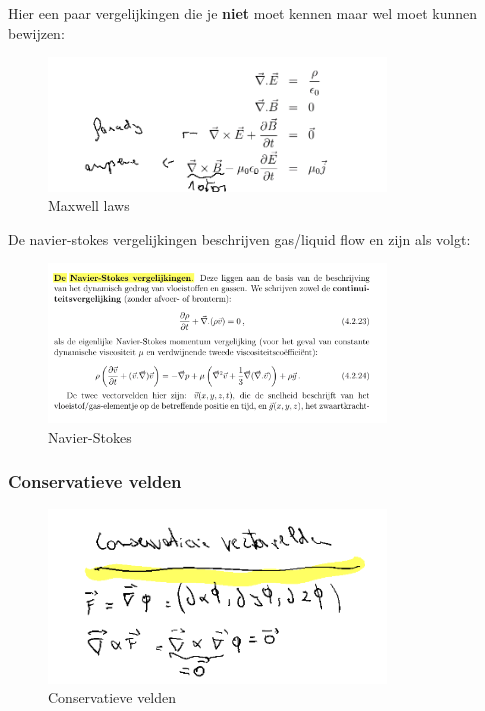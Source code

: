 \documentclass[a4paper]{article}
\begin{document}
Hier een paar vergelijkingen die je \textbf{niet} moet kennen maar wel moet kunnen bewijzen:


\begin{figure}[H]
	\centering
	\includegraphics[width=0.8\textwidth]{assets/maxwell.png}
	\caption{Maxwell laws}
	\label{fig:maxwell}
\end{figure}

De navier-stokes vergelijkingen beschrijven gas/liquid flow en zijn als volgt:

\begin{figure}[H]
	\centering
	\includegraphics[width=0.8\textwidth]{assets/navier_stokes.png}
	\caption{Navier-Stokes}
	\label{fig:navier_stokes}
\end{figure}

\subsubsection{Conservatieve velden}

\begin{figure}[H]
	\centering
	\includegraphics[width=0.8\textwidth]{assets/conservatieve_velden.png}
	\caption{Conservatieve velden}
	\label{fig:conservatieve_velden}
\end{figure}
\end{document}
